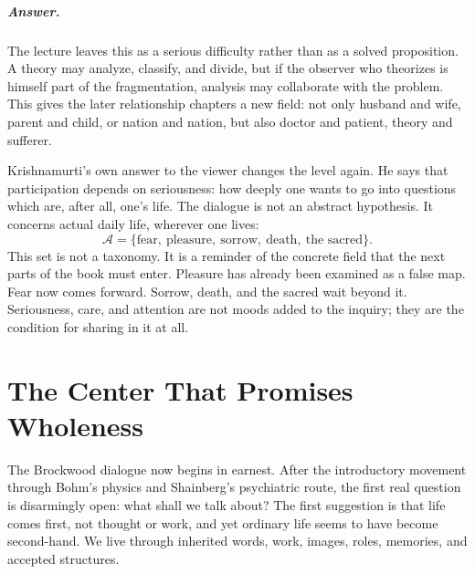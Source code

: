 \documentclass[11pt,oneside]{book}
\begin{document}
\paragraph{Answer.}
The lecture leaves this as a serious difficulty rather than as a solved proposition. A theory may analyze, classify, and divide, but if the observer who theorizes is himself part of the fragmentation, analysis may collaborate with the problem. This gives the later relationship chapters a new field: not only husband and wife, parent and child, or nation and nation, but also doctor and patient, theory and sufferer.

Krishnamurti's own answer to the viewer changes the level again. He says that participation depends on seriousness: how deeply one wants to go into questions which are, after all, one's life. The dialogue is not an abstract hypothesis. It concerns actual daily life, wherever one lives:
\begin{equation}
\mathcal{A}
=
\{\text{fear},\ \text{pleasure},\ \text{sorrow},\ \text{death},\ \text{the sacred}\}.
\end{equation}
This set is not a taxonomy. It is a reminder of the concrete field that the next parts of the book must enter. Pleasure has already been examined as a false map. Fear now comes forward. Sorrow, death, and the sacred wait beyond it. Seriousness, care, and attention are not moods added to the inquiry; they are the condition for sharing in it at all.


\chapter{The Center That Promises Wholeness}

The Brockwood dialogue now begins in earnest. After the introductory movement through Bohm's physics and Shainberg's psychiatric route, the first real question is disarmingly open: what shall we talk about? The first suggestion is that life comes first, not thought or work, and yet ordinary life seems to have become second-hand. We live through inherited words, work, images, roles, memories, and accepted structures.
\end{document}
